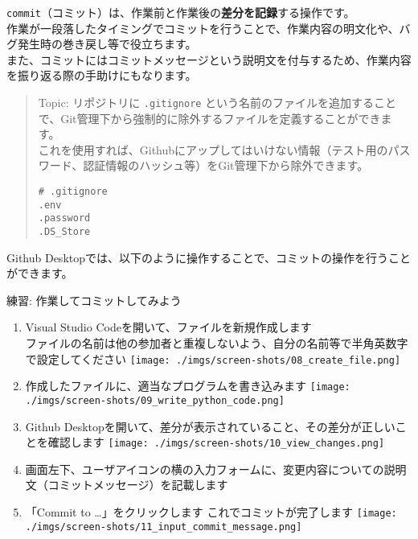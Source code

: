 \begin{Shaded}
\begin{Highlighting}[]

\end{Highlighting}
\end{Shaded}

\texttt{commit}（コミット）は、作業前と作業後の\textbf{差分を記録}する操作です。\\
作業が一段落したタイミングでコミットを行うことで、作業内容の明文化や、バグ発生時の巻き戻し等で役立ちます。\\
また、コミットにはコミットメッセージという説明文を付与するため、作業内容を振り返る際の手助けにもなります。

\begin{quote}
Topic: リポジトリに \texttt{.gitignore}
という名前のファイルを追加することで、Git管理下から強制的に除外するファイルを定義することができます。\\
これを使用すれば、Githubにアップしてはいけない情報（テスト用のパスワード、認証情報のハッシュ等）をGit管理下から除外できます。

\begin{verbatim}
# .gitignore
.env
.password
.DS_Store
\end{verbatim}
\end{quote}

Github
Desktopでは、以下のように操作することで、コミットの操作を行うことができます。

練習: 作業してコミットしてみよう

\begin{enumerate}
\def\labelenumi{\arabic{enumi}.}
\item
  Visual Studio Codeを開いて、ファイルを新規作成します\\
  ファイルの名前は他の参加者と重複しないよう、自分の名前等で半角英数字で設定してください
  \texttt{[image: ./imgs/screen-shots/08\_create\_file.png]}
\item
  作成したファイルに、適当なプログラムを書き込みます
  \texttt{[image: ./imgs/screen-shots/09\_write\_python\_code.png]}
\item
  Github
  Desktopを開いて、差分が表示されていること、その差分が正しいことを確認します
  \texttt{[image: ./imgs/screen-shots/10\_view\_changes.png]}
\item
  画面左下、ユーザアイコンの横の入力フォームに、変更内容についての説明文（コミットメッセージ）を記載します
\item
  「Commit to \ldots」をクリックします これでコミットが完了します
  \texttt{[image: ./imgs/screen-shots/11\_input\_commit\_message.png]}
\end{enumerate}

